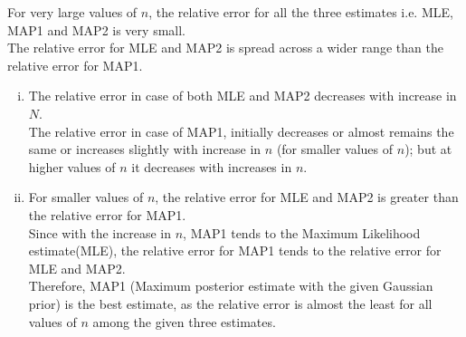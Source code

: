 \documentclass{article}
\begin{document}
\begin{enumerate}
For very large values of $n$, the relative error for all the three estimates i.e. MLE, MAP1 and MAP2 is very small. \\
The relative error for MLE and MAP2 is spread across a wider range than the relative error for MAP1.
\begin{enumerate}[(i)]
\item The relative error in case of both MLE and MAP2 decreases with increase in $N$. 
\\ The relative error in case of MAP1, initially decreases or almost remains the same or increases slightly with increase in $n$ (for smaller values of $n$); but at higher values of $n$ it decreases with increases in $n$. 
\item For smaller values of $n$, the relative error for MLE and MAP2 is greater than the relative error for MAP1. \\ 
Since with the increase in $n$, MAP1 tends to the Maximum Likelihood estimate(MLE), the relative error for MAP1 tends to the relative error for MLE and MAP2. \\
Therefore, MAP1 (Maximum posterior estimate with the given Gaussian prior) is the best estimate, as the relative error is almost the least for all values of $n$ among the given three estimates. 
\end{enumerate}

\end{enumerate}
\end{document}
